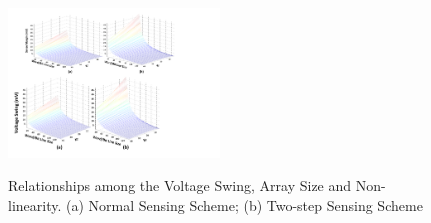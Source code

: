 %

\begin{figure}[!b]
\centering
  \includegraphics[width=0.5\textwidth]{./figures/sense_margin2}\\
  \caption{Relationships among the Voltage Swing, Array Size and Non-linearity. (a) Normal Sensing Scheme; (b) Two-step Sensing Scheme}\label{fig:sense_margin}
\end{figure} 